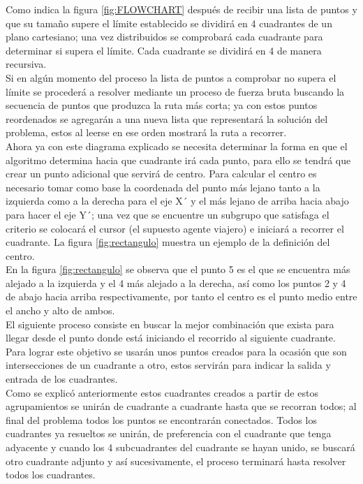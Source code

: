 \hspace*{1cm} Como indica la figura \ref {fig:FLOWCHART} después de recibir una lista de puntos y que su tamaño supere el límite establecido se dividirá en 4 cuadrantes de un plano cartesiano; una vez distribuidos se comprobará cada cuadrante para determinar si supera el límite. Cada cuadrante se dividirá en 4 de manera recursiva.\\
\hspace*{1cm} Si en algún momento del proceso la lista de puntos a comprobar no supera el límite se procederá a resolver mediante un proceso de fuerza bruta buscando la secuencia de puntos que produzca la ruta más corta; ya con estos puntos reordenados se agregarán a una nueva lista que representará la solución del problema, estos al leerse en ese orden mostrará la ruta a recorrer.\\
\hspace*{1cm} Ahora ya con este diagrama explicado se necesita determinar la forma en que el algoritmo determina hacia que cuadrante irá cada punto, para ello se tendrá que crear un punto adicional que servirá de centro. Para calcular el centro es necesario tomar como base la coordenada del punto más lejano tanto a la izquierda como a la derecha para el eje X´ y el más lejano de arriba hacia abajo para hacer el eje Y´; una vez que se encuentre un subgrupo que satisfaga el criterio se colocará el cursor (el supuesto agente viajero) e iniciará a recorrer el cuadrante. La figura \ref {fig:rectangulo} muestra un ejemplo de la definición del centro.\\
\hspace*{1cm} En la figura \ref {fig:rectangulo} se observa que el punto 5 es el que se encuentra más alejado a la izquierda y el 4 más alejado a la derecha, así como los puntos 2 y 4 de abajo hacia arriba respectivamente, por tanto el centro es el punto medio entre el ancho y alto de ambos.\\
\hspace*{1cm} El siguiente proceso consiste en buscar la mejor combinación que exista para llegar desde el punto donde está iniciando el recorrido al siguiente cuadrante. Para lograr este objetivo se usarán unos puntos creados para la ocasión que son intersecciones de un cuadrante a otro, estos servirán para indicar la salida y entrada de los cuadrantes.\\
\hspace*{1cm} Como se explicó anteriormente estos cuadrantes creados a partir de estos agrupamientos se unirán de cuadrante a cuadrante hasta que se recorran todos; al final del problema todos los puntos se encontrarán conectados. Todos los cuadrantes ya resueltos se unirán, de preferencia con el cuadrante que tenga adyacente y cuando los 4 subcuadrantes del cuadrante se hayan unido, se buscará otro cuadrante adjunto y así sucesivamente, el proceso terminará hasta resolver todos los cuadrantes.\\
